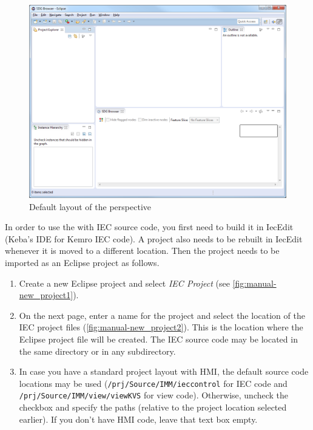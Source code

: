 \begin{figure}[htp]
  \centering
    \includegraphics[width=\textwidth]{bilder/manual-perspective}
  \caption{Default layout of the \emph{\SB} perspective}
  \label{fig:manual-perspective}
\end{figure}

In order to use the \SB with IEC source code, you first need to build it in IecEdit (Keba's IDE for Kemro IEC code). A 
project also needs to be rebuilt in IecEdit whenever it is moved to a different location. Then the project needs to be 
imported as an Eclipse project as follows.

\begin{enumerate}
  \item Create a new Eclipse project and select \emph{IEC Project} (see \autoref{fig:manual-new_project1}).
  
  \item On the next page, enter a name for the project and select the location of the IEC project files 
  (\autoref{fig:manual-new_project2}). This is the location where the Eclipse project file will be created. The IEC 
  source code may be located in the same directory or in any subdirectory.
  
  \item In case you have a standard project layout with HMI, the default source code locations may be used 
  (\texttt{/prj/Source/IMM/ieccontrol} for IEC code and \texttt{/prj/Source/IMM/view/viewKVS} for view code). 
  Otherwise, uncheck the checkbox and specify the paths (relative to the project location selected earlier). If you 
  don't have HMI code, leave that text box empty.
\end{enumerate}

